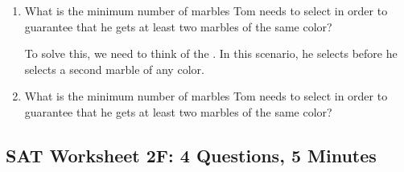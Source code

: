 \documentclass[12pt]{book}
\newcommand{\longline}{\underline{\hspace{2in}} }
\begin{document}
\begin{enumerate}[label=\alph*)]
\item What is the minimum number of marbles Tom needs to select in order to guarantee that he gets at least two marbles of the same color? 

\bigskip
To solve this, we need to think of the \longline. In this scenario, he selects \longline before he selects a second marble of any color. 


\vfill
\item What is the minimum number of marbles Tom needs to select in order to guarantee that he gets at least two marbles of the same color?
\end{enumerate}

\vfill
\newpage
\subsection{SAT Worksheet 2F: 4 Questions, 5 Minutes}
\end{document}
